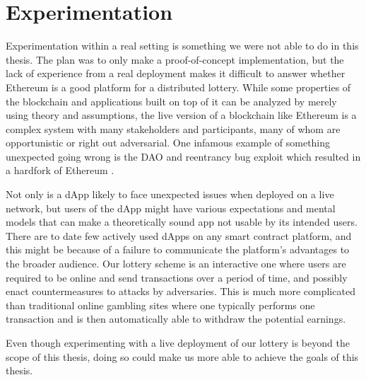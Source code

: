 \section{Experimentation}
\label{sec:experimentation}

Experimentation within a real setting is something we were not able to do in this thesis. The plan was to only make a proof-of-concept implementation, but the lack of experience from a real deployment makes it difficult to answer whether Ethereum is a good platform for a distributed lottery. While some properties of the blockchain and applications built on top of it can be analyzed by merely using theory and assumptions, the live version of a blockchain like Ethereum is a complex system with many stakeholders and participants, many of whom are opportunistic or right out adversarial. One infamous example of something unexpected going wrong is the DAO and reentrancy bug exploit which resulted in a hardfork of Ethereum \cite{dhillon_dao_2017}. 

Not only is a dApp likely to face unexpected issues when deployed on a live network, but users of the dApp might have various expectations and mental models that can make a theoretically sound app not usable by its intended users. There are to date few actively used dApps on any smart contract platform, and this might be because of a failure to communicate the platform's advantages to the broader audience. Our lottery scheme is an interactive one where users are required to be online and send transactions over a period of time, and possibly enact countermeasures to attacks by adversaries. This is much more complicated than traditional online gambling sites where one typically performs one transaction and is then automatically able to withdraw the potential earnings. 

Even though experimenting with a live deployment of our lottery is beyond the scope of this thesis, doing so could make us more able to achieve the goals of this thesis.
